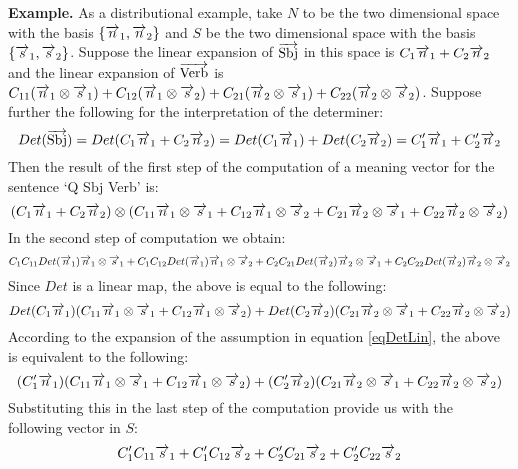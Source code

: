 \noindent
{\bf Example.} 
As a distributional example, take $N$ to be the two dimensional space with the basis $\{\overrightarrow{n}_1, \overrightarrow{n}_2\}$ and $S$ be the two dimensional space with the basis $\{\overrightarrow{s}_1, \overrightarrow{s}_2\}$.  Suppose the linear expansion of $\overrightarrow{\text{Sbj}}$ in this space is $C_1 \overrightarrow{n}_1 + C_2 \overrightarrow{n}_2$ and the linear expansion of $\overrightarrow{\text{Verb}}$ is $C_{11} (\overrightarrow{n}_1 \otimes \overrightarrow{s}_1) + C_{12} (\overrightarrow{n}_1 \otimes \overrightarrow{s}_2) +  C_{21} ( \overrightarrow{n}_2 \otimes \overrightarrow{s}_1) + C_{22} (\overrightarrow{n}_2 \otimes \overrightarrow{s}_2)$.    Suppose further the following for the interpretation of the determiner:
 \begin{equation}\label{eqDetLin}
Det(\overrightarrow{\text{Sbj}}) = Det(C_1 \overrightarrow{n}_1 + C_2 \overrightarrow{n}_2) =  Det(C_1 \overrightarrow{n}_1) + Det(C_2 \overrightarrow{n}_2) =  C'_1 \overrightarrow{n}_1 + C'_2 \overrightarrow{n}_2
\end{equation}
Then the result of the first step of the computation of a meaning vector for the sentence `Q Sbj Verb' is:
\[
(C_1\overrightarrow{n}_1 + C_2 \overrightarrow{n}_2) \otimes (C_{11} \overrightarrow{n}_1 \otimes \overrightarrow{s}_1 + C_{12} \overrightarrow{n}_1 \otimes \overrightarrow{s}_2
+ C_{21} \overrightarrow{n}_2 \otimes \overrightarrow{s}_1 + C_{22} \overrightarrow{n}_2 \otimes \overrightarrow{s}_2)
\]
In the second step of computation we obtain:
\[
C_1C_{11} Det(\overrightarrow{n}_1) \overrightarrow{n}_1 \otimes \overrightarrow{s}_1  + C_1 C_{12} Det(\overrightarrow{n}_1) \overrightarrow{n}_1 \otimes \overrightarrow{s}_2  + C_2 C_{21} Det(\overrightarrow{n}_2) \overrightarrow{n}_2 \otimes \overrightarrow{s}_1 + C_2 C_{22} Det(\overrightarrow{n}_2) \overrightarrow{n}_2 \otimes \overrightarrow{s}_2
\]
Since $Det$ is a linear map, the above is equal to the following:
\[
Det(C_1\overrightarrow{n}_1) (C_{11} \overrightarrow{n}_1 \otimes \overrightarrow{s}_1 + C_{12} \overrightarrow{n}_1 \otimes \overrightarrow{s}_2) + Det(C_2 \overrightarrow{n}_2)(C_{21} \overrightarrow{n}_2 \otimes \overrightarrow{s}_1 + C_{22} \overrightarrow{n}_2 \otimes \overrightarrow{s}_2)
\]
According to the expansion of the assumption in equation \ref{eqDetLin},  the above is equivalent to the following:
\[
(C'_1\overrightarrow{n}_1) (C_{11} \overrightarrow{n}_1 \otimes \overrightarrow{s}_1 + C_{12} \overrightarrow{n}_1 \otimes \overrightarrow{s}_2) + (C'_2 \overrightarrow{n}_2)(C_{21} \overrightarrow{n}_2 \otimes \overrightarrow{s}_1 + C_{22} \overrightarrow{n}_2 \otimes \overrightarrow{s}_2)
\]
Substituting  this in the last step of the computation provide us with the following vector in $S$:
\begin{equation}\label{eqSent}
C'_1 C_{11} \overrightarrow{s}_1 + C'_1 C_{12} \overrightarrow{s}_2 + C'_2 C_{21} \overrightarrow{s}_2 + C'_2 C_{22} \overrightarrow{s}_2
\end{equation}
%

